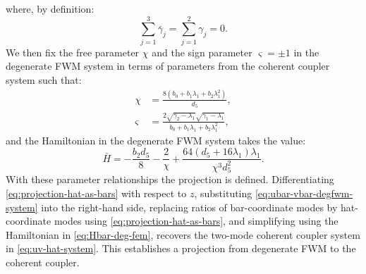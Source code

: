 \documentclass[11pt,a4paper]{article}
\numberwithin{equation}{section}
\begin{document}
where, by definition:
\begin{equation}
\sum_{j=1}^{3} {\bar{\gamma}}_{j} = \sum_{j=1}^{2} {\gamma}_{j} = 0.
\end{equation}
We then fix the free parameter $\chi$ and the sign parameter $\varsigma=\pm1$ in the degenerate FWM system in terms of parameters from the coherent coupler system such that:
\begin{align}
  \chi &= \frac{8 \left( {b}_{0} + {b}_{1} {\lambda}_{1} + {b}_{2} {\lambda}_{1}^{2} \right)}{{d}_{5}}, \\
  \varsigma &= \frac{2 \sqrt{{\gamma}_{2} - {\lambda}_{1}} \sqrt{{\gamma}_{1} - {\lambda}_{1}}}{{b}_{0} + {b}_{1} {\lambda}_{1} + {b}_{2} {\lambda}_{1}^{2}},
\end{align}
and the Hamiltonian in the degenerate FWM system takes the value:
\begin{equation}
  \bar{H} = - \frac{{b}_{2} {d}_{5}}{8} - \frac{2}{\chi} + \frac{64 \left({d}_{5} + 16 {\lambda}_{1}\right) {\lambda}_{1}}{\chi^{3} {d}_{5}^{2}}.
\end{equation}
With these parameter relationships the projection is defined. Differentiating \eqref{eq:projection-hat-as-bars} with respect to $z$, substituting \eqref{eq:ubar-vbar-degfwm-system} into the right-hand side, replacing ratios of bar-coordinate modes by hat-coordinate modes using \eqref{eq:projection-hat-as-bars}, and simplifying using the Hamiltonian in \eqref{eq:Hbar-deg-fem}, recovers the two-mode coherent coupler system in \eqref{eq:uv-hat-system}.
This establishes a projection from degenerate FWM to the coherent coupler. 
\end{document}
